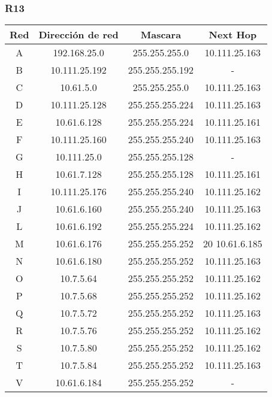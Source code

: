 \subsubsection{R13}
\begin{table}[!htbp]
\centering
  \begin{tabular}{|c|c|c|c|}
  \hline
Red & Dirección de red & Mascara & Next Hop\\ \hline
A & 192.168.25.0 & 255.255.255.0 & 10.111.25.163 \\ \hline
B & 10.111.25.192 & 255.255.255.192 & -\\ \hline
C & 10.61.5.0 & 255.255.255.0 &10.111.25.163 \\ \hline
D & 10.111.25.128 & 255.255.255.224 & 10.111.25.163 \\ \hline
E & 10.61.6.128 & 255.255.255.224 & 10.111.25.161 \\ \hline
F & 10.111.25.160 & 255.255.255.240 &10.111.25.163 \\ \hline
G & 10.111.25.0 & 255.255.255.128 & -\\ \hline
H & 10.61.7.128 & 255.255.255.128 & 10.111.25.161\\ \hline
I & 10.111.25.176 & 255.255.255.240 &10.111.25.162 \\ \hline
J & 10.61.6.160 & 255.255.255.240 & 10.111.25.163 \\ \hline
L & 10.61.6.192 & 255.255.255.224 & 10.111.25.162 \\ \hline
M & 10.61.6.176 & 255.255.255.252 & 20 10.61.6.185 \\ \hline
N & 10.61.6.180 & 255.255.255.252 & 10.111.25.163 \\ \hline
O & 10.7.5.64 & 255.255.255.252 &	10.111.25.162 \\ \hline
P & 10.7.5.68 & 255.255.255.252 & 10.111.25.162 \\ \hline
Q & 10.7.5.72 & 255.255.255.252 & 10.111.25.163 \\ \hline
R & 10.7.5.76 & 255.255.255.252 & 10.111.25.162 \\ \hline
S & 10.7.5.80 & 255.255.255.252 & 10.111.25.162\\ \hline
T & 10.7.5.84 & 255.255.255.252 & 10.111.25.163 \\ \hline
V & 10.61.6.184 & 255.255.255.252 & -\\
  \hline
 \end{tabular}
\end{table}

\newpage
